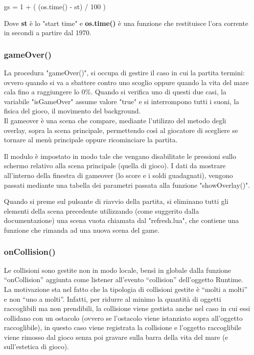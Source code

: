 \documentclass[12pt]{article}
\begin{document}
\begin{center}
    gs = 1 + ( (os.time() - st) / 100 )
\end{center}

Dove \textbf{st} è lo "start time" e \textbf{os.time()} è una funzione che restituisce l'ora corrente in secondi a partire dal 1970.

\subsubsection{gameOver()}
La procedura "gameOver()", si occupa di gestire il caso in cui la partita termini: ovvero quando si va a sbattere contro uno scoglio oppure quando la vita del mare cala fino a raggiungere lo 0\%. Quando si verifica uno di questi due casi, la variabile "isGameOver" assume valore "true" e si interrompono tutti i suoni, la fisica del gioco, il movimento del background.\\

Il gameover è una scena che compare, mediante l'utilizzo del metodo degli overlay, sopra la scena principale, permettendo così al giocatore di scegliere se tornare al menù principale oppure ricominciare la partita.

Il modulo è impostato in modo tale che vengano disabilitate le pressioni sullo schermo relativo alla scena principale (quella di gioco). I dati da mostrare all'interno della finestra di gameover (lo score e i soldi guadagnati), vengono passati mediante una tabella dei parametri passata alla funzione "showOverlay()".

Quando si preme sul pulsante di riavvio della partita, si eliminano tutti gli elementi della scena precedente utilizzando (come suggerito dalla documentazione) una scena vuota chiamata dal  "refresh.lua", che contiene una funzione che rimanda ad una nuova scena del game.
\subsubsection{onCollision()}
Le collisioni sono gestite non in modo locale, bensì in globale dalla funzione “onCollision” aggiunta come
listener all’evento “collision” dell’oggetto Runtime.
La motivazione sta nel fatto che la tipologia di collisioni gestite è “molti a molti” e non
“uno a molti”. Infatti, per ridurre al minimo la quantità di oggetti raccoglibili ma non
prendibili, la collisione viene gestista anche nel caso in cui essi collidano con un
ostacolo (ovvero se l’ostacolo viene istanziato sopra all’oggetto raccoglibile), in questo
caso viene registrata la collisione e l’oggetto raccoglibile viene rimosso dal gioco senza
poi gravare sulla barra della vita del mare (e sull’estetica di gioco).
\end{document}
